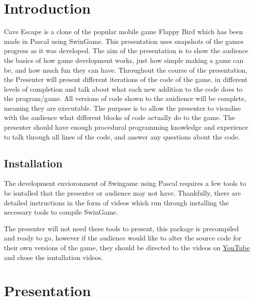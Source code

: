 \documentclass[12pt]{article}
\begin{document}
\section{Introduction}
Cave Escape is a clone of the popular mobile game Flappy Bird which has been made in
Pascal using SwinGame. This presentation uses snapshots of the games progress as it was developed.
\newline
\newline
The aim of the presentation is to show the audience the basics of how game development works, just how simple making
a game can be, and how much fun they can have.
\newline
\newline
Throughout the course of the presentation, the Presenter will present different iterations of the code of the game, in different levels of completion and
talk about what each new addition to the code does to the program/game.
\newline
\newline
All versions of code shown to the auidience will be complete, meaning they are executable. The purpose is to allow the presenter to visualise
with the audience what different blocks of code actually do to the game.
\newline
\newline
The presenter should have enough procedural programming knowledge and experience to talk through all lines of the code, and answer any questions about the code.

\subsection{Installation}
The development envioronment of Swingame using Pascal requires a few tools to be isntalled that the presenter or audience
may not have. Thankfully, there are detailed instructions in the form of videos which run through installing the necessary tools to compile SwinGame.

The presenter will not need these tools to present, this package is precompiled and ready to go, however if the audience would like to alter the source code
for their own versions of the game, they should be directed to the videos on
\href{https://www.youtube.com/playlist?list=PLdVESrjTNUXtU8zclRh9ovhstzWQAY05U}{\underline{YouTube}} and chose the isntallation videos.
\pagebreak

\section{\Large\textbf{Presentation}}
\end{document}
